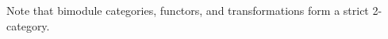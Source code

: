 \documentclass{amsart}
\begin{document}
%
%
	
%
\nid Note that bimodule categories, functors, and transformations form a strict 2-category.  %
 
\end{document}
